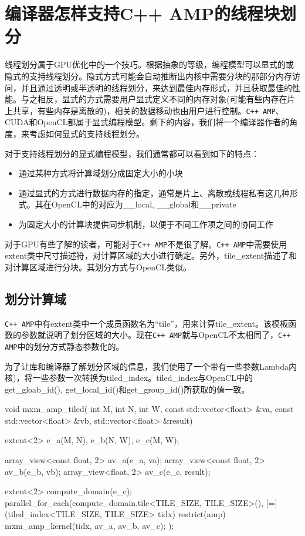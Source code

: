 \section{编译器怎样支持C++ AMP的线程块划分}

线程划分属于GPU优化中的一个技巧。根据抽象的等级，编程模型可以显式的或隐式的支持线程划分。隐式方式可能会自动推断出内核中需要分块的那部分内存访问，并且通过透明或半透明的线程划分，来达到最佳内存形式，并且获取最佳的性能。与之相反，显式的方式需要用户显式定义不同的内存对象(可能有些内存在片上共享，有些内存是离散的)，相关的数据移动也由用户进行控制。\texttt{C++ AMP}、CUDA和OpenCL都属于显式编程模型。剩下的内容，我们将一个编译器作者的角度，来考虑如何显式的支持线程划分。

对于支持线程划分的显式编程模型，我们通常都可以看到如下的特点：

\begin{itemize}
\item 通过某种方式将计算域划分成固定大小的小块
\item 通过显式的方式进行数据内存的指定，通常是片上、离散或线程私有这几种形式。其在OpenCL中的对应为\_\allowbreak{}\_\allowbreak{}local, \_\allowbreak{}\_\allowbreak{}global和\_\allowbreak{}\_\allowbreak{}private
\item 为固定大小的计算块提供同步机制，以便于不同工作项之间的协同工作
\end{itemize}

对于GPU有些了解的读者，可能对于\texttt{C++ AMP}不是很了解。\texttt{C++ AMP}中需要使用extent类中尺寸描述符，对计算区域的大小进行确定。另外，tile\_\allowbreak{}extent描述了和对计算区域进行分块。其划分方式与OpenCL类似。

\subsection{划分计算域}

\texttt{C++ AMP}中有extent类中一个成员函数名为“tile”，用来计算tile\_\allowbreak{}extent。该模板函数的参数就说明了划分区域的大小。现在\texttt{C++ AMP}就与OpenCL不太相同了，\texttt{C++ AMP}中的划分方式静态参数化的。

为了让库和编译器了解划分区域的信息，我们使用了一个带有一些参数Lambda内核)，将一些参数一次转换为tiled\_\allowbreak{}index。tiled\_\allowbreak{}index与OpenCL中的get\_\allowbreak{}gloab\_\allowbreak{}id(), get\_\allowbreak{}local\_\allowbreak{}id()和get\_\allowbreak{}group\_\allowbreak{}id()所获取的值一致。

\begin{codebox}[cpp]
void mxm_amp_tiled(
  int M, int N, int W,
  const std::vector<float> &va,
  const std::vector<float> &vb,
  std::vector<float> &result){

  extent<2> e_a(M, N), e_b(N, W), e_c(M, W);

  array_view<const float, 2> av_a(e_a, va);
  array_view<const float, 2> av_b(e_b, vb);
  array_view<float, 2> av_c(e_c, result);

  extent<2> compute_domain(e_c);
  parallel_for_each(compute_domain.tile<TILE_SIZE, TILE_SIZE>(),
    [=](tiled_index<TILE_SIZE, TILE_SIZE> tidx) restrict(amp) {
      mxm_amp_kernel(tidx, av_a, av_b, av_c);
    });
}
\end{codebox}

